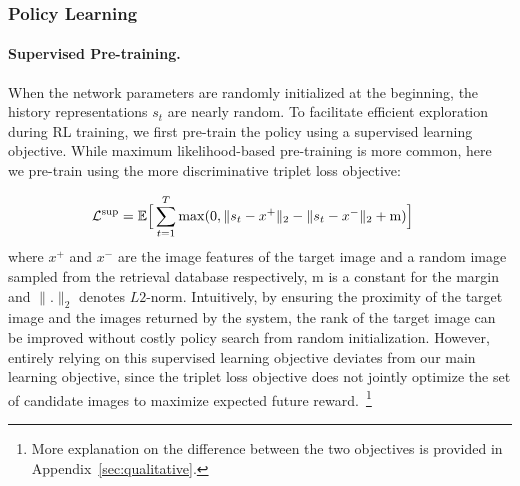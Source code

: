 \subsubsection{Policy Learning} 

\paragraph{Supervised Pre-training.} 
When the network parameters are randomly initialized at the beginning, 
the history representations $s_{t}$ are nearly random. 
To facilitate efficient exploration during RL training, we first 
pre-train the policy using a supervised learning objective.
While maximum likelihood-based pre-training is more common, here we pre-train using the more discriminative triplet loss objective:

\begin{equation}
\begin{aligned}
\vspace{-2em}
\mathcal{L}^{\textrm{sup}} &= \mathbb{E} \Big[ \sum_{t=1}^{T} \max(0, \|s_{t} 
- x^{+}\|_2 - \|s_{t} - x^{-}\|_2 + \text{m})  \Big]
\end{aligned}
\end{equation}
where $x^{+}$ and $x^{-}$ are the image features of the target image and a random 
image sampled from the retrieval database respectively, $\text{m}$ is a constant for the margin and $\|.\|_2$ denotes $L2$-norm. 
Intuitively, by ensuring the proximity of the target image and the images 
returned by the system, the rank of the target image can be improved 
without costly policy search from random initialization. However, 
entirely relying on this supervised learning objective deviates from our 
main learning objective, since the triplet loss objective does not 
jointly optimize the set of candidate images to maximize expected future 
reward.~\footnote{More explanation on the difference between the two objectives
is provided in Appendix~\ref{sec:qualitative}.}

